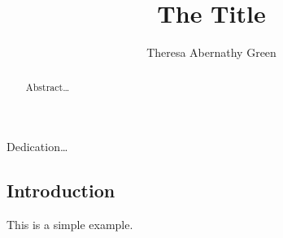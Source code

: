 \documentclass{ucdthesis}
\author{Theresa Abernathy Green}
\title{The Title}
\begin{document}
\begin{frontmatter}
  \maketitle
  \begin{abstract}
  Abstract\ldots
  \end{abstract}
  \begin{dedication}
  Dedication\ldots
  \end{dedication}
  \tableofcontents
\end{frontmatter}
\begin{mainmatter}
  \chapter{Introduction}
  \par This is a simple example.
\end{mainmatter}
\end{document}
